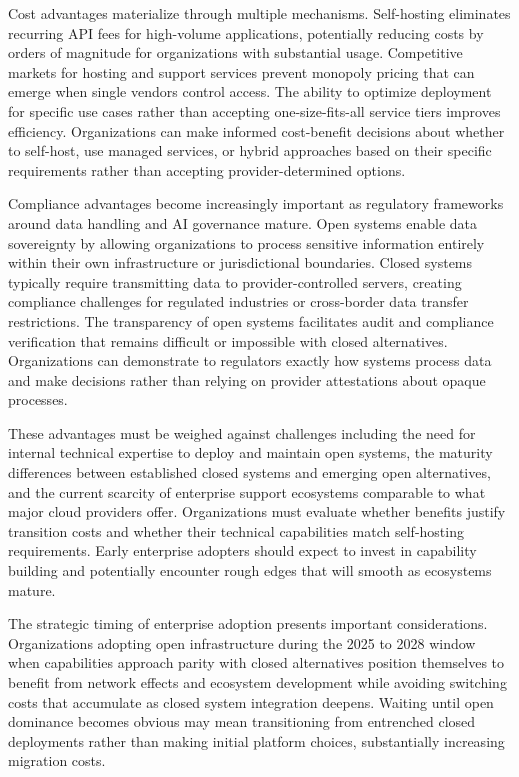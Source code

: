 Cost advantages materialize through multiple mechanisms. Self-hosting eliminates recurring API fees for high-volume applications, potentially reducing costs by orders of magnitude for organizations with substantial usage. Competitive markets for hosting and support services prevent monopoly pricing that can emerge when single vendors control access. The ability to optimize deployment for specific use cases rather than accepting one-size-fits-all service tiers improves efficiency. Organizations can make informed cost-benefit decisions about whether to self-host, use managed services, or hybrid approaches based on their specific requirements rather than accepting provider-determined options.

Compliance advantages become increasingly important as regulatory frameworks around data handling and AI governance mature. Open systems enable data sovereignty by allowing organizations to process sensitive information entirely within their own infrastructure or jurisdictional boundaries. Closed systems typically require transmitting data to provider-controlled servers, creating compliance challenges for regulated industries or cross-border data transfer restrictions. The transparency of open systems facilitates audit and compliance verification that remains difficult or impossible with closed alternatives. Organizations can demonstrate to regulators exactly how systems process data and make decisions rather than relying on provider attestations about opaque processes.

These advantages must be weighed against challenges including the need for internal technical expertise to deploy and maintain open systems, the maturity differences between established closed systems and emerging open alternatives, and the current scarcity of enterprise support ecosystems comparable to what major cloud providers offer. Organizations must evaluate whether benefits justify transition costs and whether their technical capabilities match self-hosting requirements. Early enterprise adopters should expect to invest in capability building and potentially encounter rough edges that will smooth as ecosystems mature.

The strategic timing of enterprise adoption presents important considerations. Organizations adopting open infrastructure during the 2025 to 2028 window when capabilities approach parity with closed alternatives position themselves to benefit from network effects and ecosystem development while avoiding switching costs that accumulate as closed system integration deepens. Waiting until open dominance becomes obvious may mean transitioning from entrenched closed deployments rather than making initial platform choices, substantially increasing migration costs.

